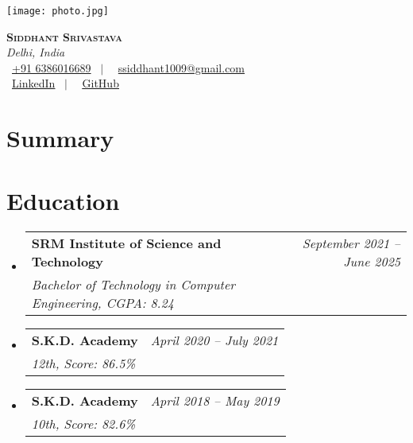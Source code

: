 \documentclass[a4paper,11pt]{article}
\makeatletter
\newcommand{\resumeSubheading}[4]{
    \vspace{-2pt}\item
        \begin{tabular*}{0.97\textwidth}[t]{l@{\extracolsep{\fill}}r}
            \textbf{#1} & #2 \\
            \textit{\small#3} & \textit{\small #4} \\
        \end{tabular*}\vspace{-10pt} %
}
\newcommand{\resumeSubHeadingListStart}{\begin{itemize}[leftmargin=0.15in, label={}]}
\newcommand{\resumeSubHeadingListEnd}{\end{itemize}}
\makeatother
\begin{document}

\begin{minipage}[c]{0.20\textwidth}
        \centering
        \texttt{[image: photo.jpg]} %
\end{minipage}%
\vrule width 1pt %
\hspace{10pt} %
\begin{minipage}[c]{0.7\textwidth}
        \raggedright %
        {\Huge \textbf{\scshape Siddhant Srivastava}} \\[7pt] %
        \textit{Delhi, India} \\[9pt] %
        \faPhone \ \href{tel:+916386016689}{+91 6386016689} \, $|$ \,
        \faEnvelope \ \href{mailto:ssiddhant1009@gmail.com}{ssiddhant1009@gmail.com} \\[5pt] %
        \faLinkedinSquare \ \href{https://linkedin.com/in/siddhant-srivastava-}{\underline{LinkedIn}} \, $|$ \,
        \faGithub \ \href{https://github.com/sidd1092}{\underline{GitHub}}
\end{minipage}

\section{Summary}
\begin{itemize}[leftmargin=0.15in, label={}]
     \small{\item{
    }}
\end{itemize}

\section{Education}
    \resumeSubHeadingListStart
        \resumeSubheading
            {SRM Institute of Science and Technology}{\textit{\large September 2021 --  June 2025}}
            {Bachelor of Technology in Computer Engineering, \large  CGPA: 8.24}{}
        \resumeSubheading
            {S.K.D. Academy}{\textit{ April 2020 -- July 2021}}
            {12th, \large Score: 86.5\%}{}
        \resumeSubheading
            {S.K.D. Academy}{\textit{April 2018 -- May 2019}}
            {10th, \large Score: 82.6\%}{}
    \resumeSubHeadingListEnd
\end{document}
